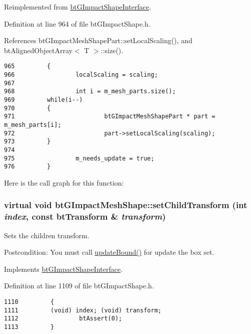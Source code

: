 Reimplemented from \hyperlink{classbt_g_impact_shape_interface_dec0bd43cd0105b1d0dc172bc7db50d8}{btGImpactShapeInterface}.

Definition at line 964 of file btGImpactShape.h.

References btGImpactMeshShapePart::setLocalScaling(), and btAlignedObjectArray$<$ T $>$::size().

\begin{Code}\begin{verbatim}965         {
966                 localScaling = scaling;
967 
968                 int i = m_mesh_parts.size();
969         while(i--)
970         {
971                         btGImpactMeshShapePart * part = m_mesh_parts[i];
972                         part->setLocalScaling(scaling);
973         }
974 
975                 m_needs_update = true;
976         }
\end{verbatim}
\end{Code}




Here is the call graph for this function:\hypertarget{classbt_g_impact_mesh_shape_274feed3c9a38a6af5c9f1141ae9ac1a}{
\subsubsection[setChildTransform]{\setlength{\rightskip}{0pt plus 5cm}virtual void btGImpactMeshShape::setChildTransform (int {\em index}, \/  const btTransform \& {\em transform})}}
\label{classbt_g_impact_mesh_shape_274feed3c9a38a6af5c9f1141ae9ac1a}


Sets the children transform. 

\begin{Desc}
\item[Postcondition:]You must call \hyperlink{classbt_g_impact_shape_interface_cb26c2d7a2aecabd06b996b72b848492}{updateBound()} for update the box set. \end{Desc}


Implements \hyperlink{classbt_g_impact_shape_interface_83392f97bd7dfeb71ccdce6913a465b0}{btGImpactShapeInterface}.

Definition at line 1109 of file btGImpactShape.h.

\begin{Code}\begin{verbatim}1110         {
1111         (void) index; (void) transform;
1112                 btAssert(0);
1113         }
\end{verbatim}
\end{Code}



